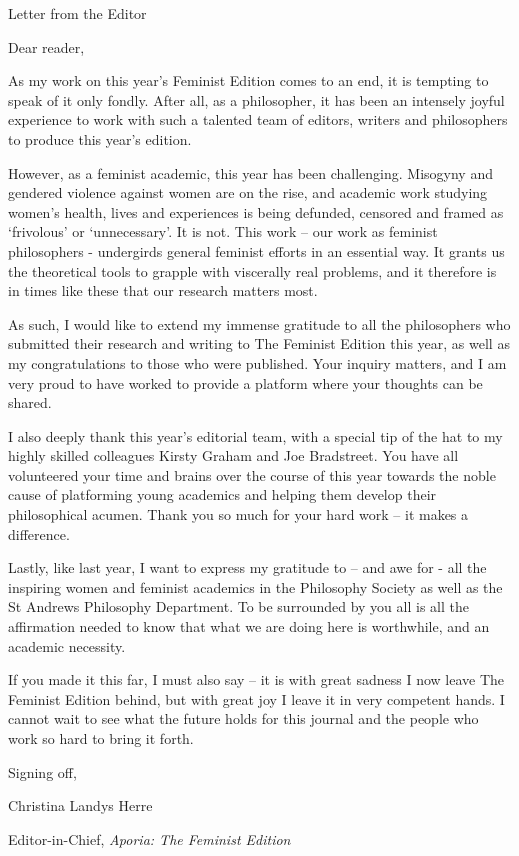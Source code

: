 \vspace*{\credgap}
{\noindent\LARGE\sc Letter from the Editor}
\vspace{\credgap}

\vspace{\ackgap}\noindent
Dear reader,

\vspace{\credgap}\noindent
As my work on this year’s Feminist Edition comes to an end, it is
tempting to speak of it only fondly. After all, as a philosopher, it
has been an intensely joyful experience to work with such a talented
team of editors, writers and philosophers to produce this year’s
edition.

However, as a feminist academic, this year has been challenging.
Misogyny and gendered violence against women are on the rise, and
academic work studying women’s health, lives and experiences is being
defunded, censored and framed as ‘frivolous’ or ‘unnecessary’. It is
not. This work – our work as feminist philosophers - undergirds
general feminist efforts in an essential way. It grants us the
theoretical tools to grapple with viscerally real problems, and it
therefore is in times like these that our research matters most.

As such, I would like to extend my immense gratitude to all the
philosophers who submitted their research and writing to The Feminist
Edition this year, as well as my congratulations to those who were
published. Your inquiry matters, and I am very proud to have worked to
provide a platform where your thoughts can be shared.

I also deeply thank this year’s editorial team, with a special tip of
the hat to my highly skilled colleagues Kirsty Graham and Joe
Bradstreet. You have all volunteered your time and brains over the
course of this year towards the noble cause of platforming young
academics and helping them develop their philosophical acumen. Thank
you so much for your hard work – it makes a difference.

Lastly, like last year, I want to express my gratitude to – and awe
for - all the inspiring women and feminist academics in the Philosophy
Society as well as the St Andrews Philosophy Department. To be
surrounded by you all is all the affirmation needed to know that what
we are doing here is worthwhile, and an academic necessity.

If you made it this far, I must also say – it is with great sadness I
now leave The Feminist Edition behind, but with great joy I leave it
in very competent hands. I cannot wait to see what the future holds
for this journal and the people who work so hard to bring it forth.

\vspace{\credgap}\noindent
Signing off,

\vspace{\ackgap}\noindent
Christina Landys Herre

\noindent
Editor-in-Chief, \emph{Aporia: The Feminist Edition}
